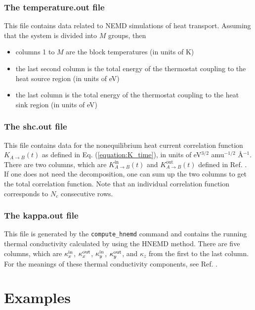 \documentclass[12pt,a4paper]{report}
\begin{document}
\subsection{The temperature.out file}

This file contains data related to NEMD simulations of heat transport. Assuming that the system is divided into $M$ groups, then
\begin{itemize}
\item columns 1 to $M$ are the block temperatures (in units of K)
\item the last second column is the total energy of the thermostat coupling to the heat source region (in units of eV)
\item the last column is the total energy of the thermostat coupling to the heat sink region (in units of eV)
\end{itemize}


\subsection{The shc.out file}

This file contains data for the nonequilibrium heat current correlation function $K_{A \rightarrow B}(t)$ as defined in Eq. (\ref{equation:K_time}), in units of eV$^{3/2}$ amu$^{-1/2}$ \AA$^{-1}$. There are two columns, which are $K_{A \rightarrow B}^{\text{in}}(t)$ and $K_{A \rightarrow B}^{\text{out}}(t)$ defined in Ref. \cite{fan2017prb}. If one does not need the decomposition, one can sum up the two columns to get the total correlation function. Note that an individual correlation function corresponds to $N_c$ consecutive rows.


\subsection{The kappa.out file}

This file is generated by the \verb"compute_hnemd" command and contains the running thermal conductivity calculated by using the HNEMD method. There are five columns, which are $\kappa^{\rm in}_x$, $\kappa^{\rm out}_x$, $\kappa^{\rm in}_y$, $\kappa^{\rm out}_y$, and $\kappa_z$ from the first to the last column. For the meanings of these thermal conductivity components, see Ref. \cite{fan2018submitted,xu2018msmse,dong2018pccp}.

\chapter{Examples\label{chapter:examples}}
\end{document}
